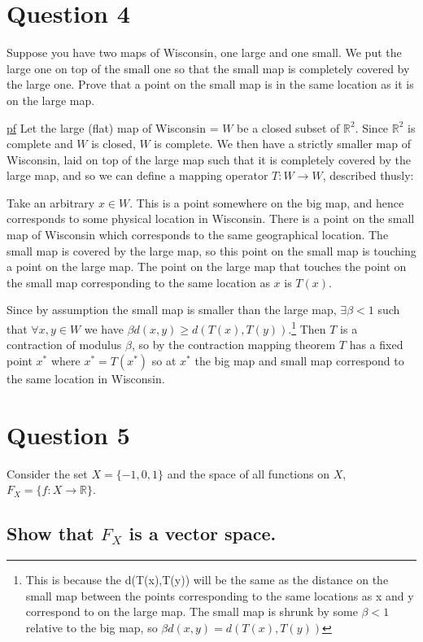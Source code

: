 \documentclass[11pt]{article} %
\begin{document}
\section{Question 4}
Suppose you have two maps of Wisconsin, one large and one small. We put the large one on top of the small one so that the small map is completely covered by the large one. Prove that a point on the small map is in the same location as it is on the large map.

\underline{pf} Let the large (flat) map of Wisconsin = $W$ be a closed subset of $\mathbb{R}^2$. Since $\mathbb{R}^2$ is complete and $W$ is closed, $W$ is complete. We then have a strictly smaller map of Wisconsin, laid on top of the large map such that it is completely covered by the large map, and so we can define a mapping operator $T: W \rightarrow W$, described thusly: 

Take an arbitrary $x \in W$. This is a point somewhere on the big map, and hence corresponds to some physical location in Wisconsin. There is a point on the small map of Wisconsin which corresponds to the same geographical location. The small map is covered by the large map, so this point on the small map is touching a point on the large map. The point on the large map that touches the point on the small map corresponding to the same location as $x$ is $T(x)$.

Since by assumption the small map is smaller than the large map, $\exists \beta <1$ such that $\forall x,y \in W$ we have $\beta d(x,y)\geq d(T(x),T(y)).$\footnote{This is because the d(T(x),T(y)) will be the same as the distance on the small map between the points corresponding to the same locations as x and y correspond to on the large map. The small map is shrunk by some $\beta <1$ relative to the big map, so $\beta d(x,y) = d(T(x),T(y))$ } Then $T$ is a contraction of modulus $\beta$, so by the contraction mapping theorem $T$ has a fixed point $x^*$ where $x^* = T(x^*)$ so at $x^*$ the big map and small map correspond to the same location in Wisconsin.

\section{Question 5}
Consider the set $X = \{ -1, 0, 1 \}$ and the space of all functions on $X$, $F_X = \{ f: X \rightarrow \mathbb{R} \}$.

\subsection{Show that $F_X$ is a vector space.}
\end{document}

